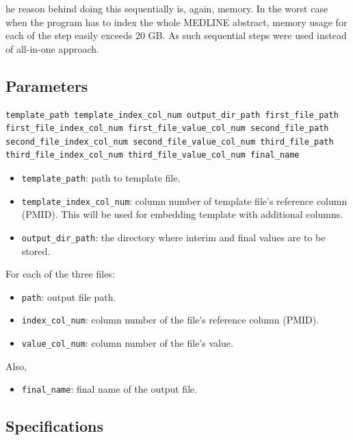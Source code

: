 he reason behind doing this sequentially is, again, memory. In the worst case when the program has to index the whole MEDLINE abstract, memory usage for each of the step easily exceeds 20 GB. As such sequential steps were used instead of all-in-one approach.

\subsection{Parameters}

\begin{lstlisting}[breaklines]
template_path template_index_col_num output_dir_path first_file_path first_file_index_col_num first_file_value_col_num second_file_path second_file_index_col_num second_file_value_col_num third_file_path third_file_index_col_num third_file_value_col_num final_name
\end{lstlisting}

\begin{itemize}
\item \texttt{template\_path}: path to template file.
\item \texttt{template\_index\_col\_num}: column number of template file's reference column (PMID). This will be used for embedding template with additional columns.
\item \texttt{output\_dir\_path}: the directory where interim and final values are to be stored.
\end{itemize}

For each of the three files:

\begin{itemize}
\item \texttt{path}: output file path.
\item \texttt{index\_col\_num}: column number of the file's reference column (PMID).
\item \texttt{value\_col\_num}: column number of the file's value.
\end{itemize}

Also,

\begin{itemize}
\item \texttt{final\_name}: final name of the output file.
\end{itemize}

\subsection{Specifications}

